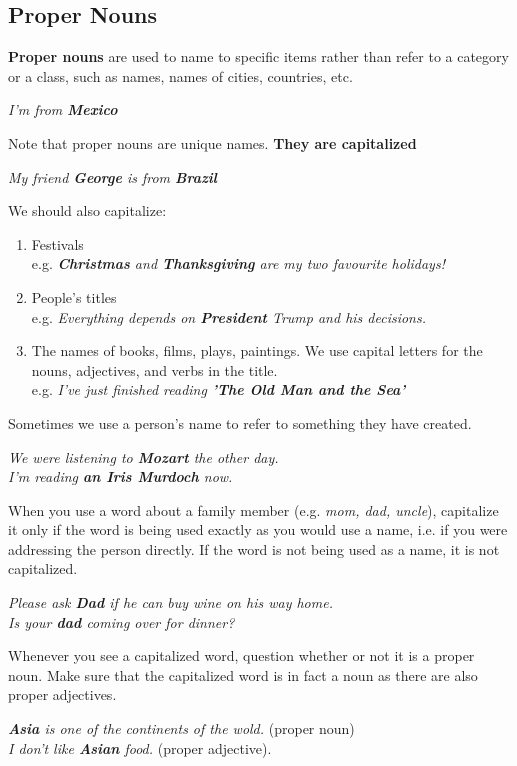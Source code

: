 \documentclass[hidelinks,10pt,a4paper]{article}
\begin{document}
\subsection{Proper Nouns}
\textbf{Proper nouns} are used to name to specific items rather than refer to a category or a class, such as names, names of cities, countries, etc.
\begin{center}
		\textit{I'm from \textbf{Mexico} }
\end{center}
Note that proper nouns are unique names. \textbf{They are capitalized}
\begin{center}
	\textit{My friend \textbf{George} is from \textbf{Brazil}  }
\end{center}
We should also capitalize:
\begin{enumerate}[label=\alph*)]
		\item Festivals\\
				e.g. \textit{\textbf{Christmas} and \textbf{Thanksgiving} are my two favourite holidays!}
		\item People's titles\\
				e.g. \textit{Everything depends on \textbf{President} Trump and his decisions.}
		\item The names of books, films, plays, paintings. We use capital letters for the nouns, adjectives, and verbs in the title.\\
				e.g. \textit{I've just finished reading \textbf{'The Old Man and the Sea'}}
\end{enumerate}
Sometimes we use a person's name to refer to something they have created.
\begin{center}
\textit{We were listening to \textbf{Mozart} the other day.}\\
\textit{I'm reading \textbf{an Iris Murdoch} now.}
\end{center}

When you use a word about a family member (e.g. \textit{mom, dad, uncle}), capitalize it only if the word is being used exactly as you would use a name, i.e. if you were addressing the person directly. If the word is not being used as a name, it is not capitalized.
\begin{center}
		\textit{Please ask \textbf{Dad} if he can buy wine on his way home.}\\
		\textit{Is your \textbf{dad} coming over for dinner?}
\end{center}
Whenever you see a capitalized word, question whether or not it is a proper noun. Make sure that the capitalized word is in fact a noun as there are also proper adjectives.
\begin{center}
		\textit{ \textbf{Asia} is one of the continents of the wold.} (proper noun)\\
		\textit{I don't like \textbf{Asian} food.} (proper adjective).
\end{center}
\end{document}
